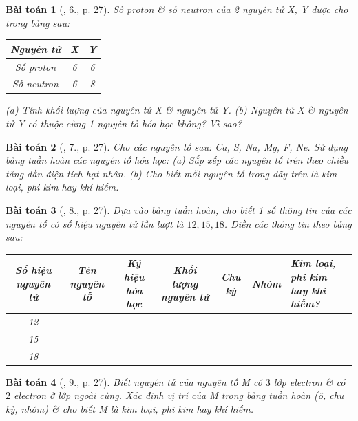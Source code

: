 \documentclass{article}
\newtheorem{baitoan}{Bài toán}
\begin{document}
\begin{baitoan}[\cite{SGK_KHTN_7_Canh_Dieu}, 6., p. 27]
	Số proton \& số neutron của 2 nguyên tử X, Y được cho trong bảng sau:
	\begin{table}[H]
		\centering
		\begin{tabular}{|c|c|c|}
			\hline
			Nguyên tử & X & Y \\
			\hline
			Số proton & 6 & 6 \\
			\hline
			Số neutron & 6 & 8 \\
			\hline
		\end{tabular}
	\end{table}
	\noindent(a) Tính khối lượng của nguyên tử X \& nguyên tử Y. (b) Nguyên tử X \& nguyên tử Y có thuộc cùng 1 nguyên tố hóa học không? Vì sao?
\end{baitoan}

\begin{baitoan}[\cite{SGK_KHTN_7_Canh_Dieu}, 7., p. 27]
	Cho các nguyên tố sau: \emph{Ca, S, Na, Mg, F, Ne}. Sử dụng bảng tuần hoàn các nguyên tố hóa học: (a) Sắp xếp các nguyên tố trên theo chiều tăng dần điện tích hạt nhân. (b) Cho biết mỗi nguyên tố trong dãy trên là kim loại, phi kim hay khí hiếm.
\end{baitoan}

\begin{baitoan}[\cite{SGK_KHTN_7_Canh_Dieu}, 8., p. 27]
	Dựa vào bảng tuần hoàn, cho biết 1 số thông tin của các nguyên tố có số hiệu nguyên tử lần lượt là $12,15,18$. Điền các thông tin theo bảng sau:
	\begin{table}[H]
		\centering
		\begin{tabular}{|c|c|c|c|c|c|p{3.5cm}|}
			\hline
			Số hiệu nguyên tử & Tên nguyên tố & Ký hiệu hóa học & Khối lượng nguyên tử & Chu kỳ & Nhóm & Kim loại, phi kim hay khí hiếm? \\
			\hline
			12 &  &  &  &  &  &  \\
			\hline
			15 &  &  &  &  &  &  \\
			\hline
			18 &  &  &  &  &  &  \\
			\hline
		\end{tabular}
	\end{table}
\end{baitoan}

\begin{baitoan}[\cite{SGK_KHTN_7_Canh_Dieu}, 9., p. 27]
	Biết nguyên tử của nguyên tố M có $3$ lớp electron \& có $2$ electron ở lớp ngoài cùng. Xác định vị trí của M trong bảng tuần hoàn (ô, chu kỳ, nhóm) \& cho biết M là kim loại, phi kim hay khí hiếm.
\end{baitoan}
\end{document}
